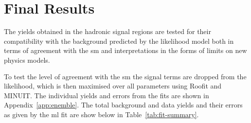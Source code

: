 \section{Final Results} %
\label{sec:final_results}
The yields obtained in the hadronic signal regions are tested for their 
compatibility with the background predicted by the likelihood model both in 
terms of agreement with the \ac{sm} and interpretations in the forms of 
limits on new physics models.

To test the level of agreement with the \ac{sm} the signal terms are 
dropped from the likelihood, which is then maximised over all parameters using 
Roofit\cite{ROOSTATS} and MINUIT\cite{MINOS}. The individual yields and errors 
from the fits are shown in Appendix~\ref{app:enemble}. The total background and 
data yields and their errors as given by the \ac{ml} fit are show below in 
Table~\ref{tab:fit-summary}.

